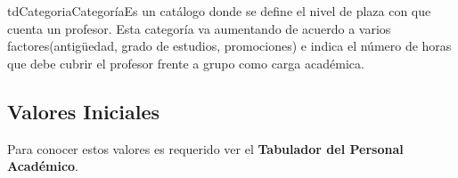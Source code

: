 	
	\begin{TipoDeDato}{tdCategoria}{Categoría}{Es un catálogo donde se define el nivel de plaza con que cuenta un profesor. Esta categoría va aumentando de acuerdo a varios factores(antigüedad, grado de estudios, promociones) e indica el número de horas que debe cubrir el profesor frente a grupo como carga académica.}
	
		\begin{tdAtributos}
		
			
			
		\end{tdAtributos}
	
		\subsection{Valores Iniciales}
				
		Para conocer estos valores es requerido ver el \textbf{Tabulador del Personal Académico}.
	\end{TipoDeDato}
	
